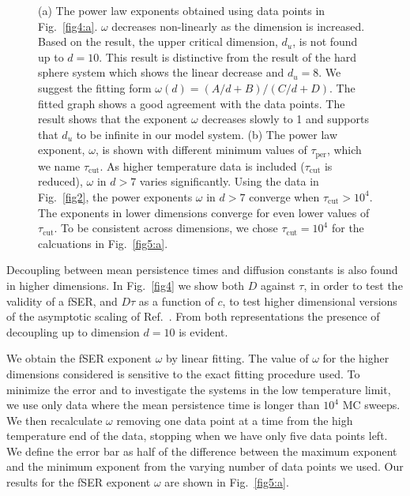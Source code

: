 \documentclass[showpacs,pre,aps,twocolumn,superscriptaddress]{revtex4-1}
\begin{document}
\begin{figure}[t]
 \begin{center}
 \end{center}
 \vspace{-20pt}
 \caption{\label{fig5}  
 		         (a) The power law exponents obtained using data points in Fig.~\ref{fig4:a}.
                         $\omega$ decreases non-linearly as the dimension is increased.
                         Based on the result, the upper critical dimension, $d_u$, is not found up to $d=10$.
                         This result is distinctive from the result of the hard sphere system which shows the linear decrease and $d_u=8$.
                         We suggest the fitting form $\omega(d)=(A/d+B)/(C/d+D)$.
                         The fitted graph shows a good agreement with the data points.
                         The result shows that the exponent ${\omega}$ decreases slowly to 1
                         and supports that $d_u$ to be infinite in our model system.
                         (b) The power law exponent, $\omega$, is shown with different minimum values of $\tau_\text{per}$, which we name $\tau_\text{cut}$.
                         As higher temperature data is included ($\tau_{\text{cut}}$ is reduced), $\omega$ in $d>7$ varies significantly. 
			Using the data in Fig.~\ref{fig2}, the power exponents $\omega$ in $d>7$ converge when $\tau_{\text{cut}} >10^4$.
			The exponents in lower dimensions converge for even lower values of $\tau_\text{cut}$.
			To be consistent across dimensions, we chose $\tau_\text{cut}=10^4$ for the calcuations in Fig.~\ref{fig5:a}.  
		}
\end{figure}

Decoupling between mean persistence times and diffusion constants is also found in higher dimensions.  In Fig.~\ref{fig4} we show both $D$ against $\tau$, in order to test the validity of a fSER, and $D \tau$ as a function of $c$, to test higher dimensional versions of the asymptotic scaling of Ref.~\cite{Blondel2014}.  From both representations the presence of decoupling up to dimension $d=10$ is evident.

We obtain the fSER exponent $\omega$ by linear fitting.
The value of $\omega$ for the higher dimensions considered is sensitive to the exact fitting procedure used.  To minimize the error and to investigate the systems in the low temperature limit, we use only data where the mean persistence time is longer than $10^4$ MC sweeps. We then recalculate $\omega$ removing one data point at a time from the high temperature end of the data, stopping when we have only five data points left.
We define the error bar as half of the difference between the maximum exponent and the minimum exponent
from the varying number of data points we used.
Our results for the fSER exponent $\omega$ are shown in Fig.~\ref{fig5:a}.
\end{document}
